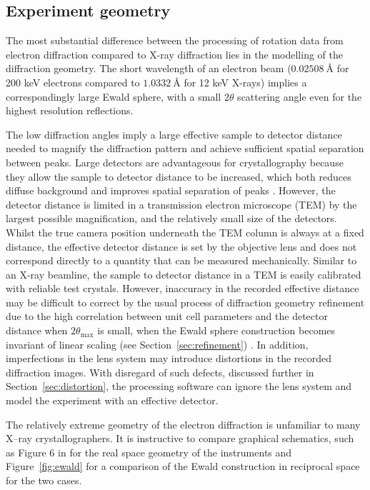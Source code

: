 \documentclass[preprint]{iucr}
\begin{document}
\subsection{Experiment geometry}

The most substantial difference between the processing of rotation data from
electron diffraction compared to X-ray diffraction lies in the modelling of the
diffraction geometry. The short wavelength of an electron beam
($\SI{0.02508}{\angstrom}$ for 200 keV electrons compared to
$\SI{1.0332}{\angstrom}$ for 12 keV X-rays) implies a correspondingly large
Ewald sphere, with a small
$2\theta$ scattering angle even for the highest resolution reflections.

The low
diffraction angles imply a large effective sample to detector distance needed to magnify
the diffraction pattern and achieve sufficient spatial
separation between peaks. Large detectors are advantageous
for crystallography because they allow the sample to detector distance to
be increased, which both reduces diffuse background and improves spatial
separation of peaks \cite{Stanton1993}. However,
the detector distance is limited in a transmission electron microscope (TEM)
by the largest possible magnification,
and the relatively small size of the detectors. Whilst the true camera position underneath the
TEM column is always at a fixed distance, the effective detector distance
is set by the objective lens and does not correspond directly to a quantity that
can be measured mechanically. Similar to an X-ray beamline, the sample to detector distance in
a TEM is easily calibrated with reliable test crystals. However,
inaccuracy in the recorded effective distance may be difficult to correct by the
usual process of diffraction geometry refinement due to the high correlation
between unit cell parameters and the detector distance when
$2\theta_{\text{max}}$ is small, when the Ewald sphere construction becomes
invariant of linear scaling (see Section~\ref{sec:refinement}) \cite{VanGenderen2016}.
In addition,
imperfections in the lens system may introduce distortions in the recorded
diffraction images.
With disregard of such defects, discussed further in Section~\ref{sec:distortion},
the processing software can ignore the lens system and model the experiment
with an effective detector.

The relatively
extreme geometry of the electron diffraction is unfamiliar to many X--ray
crystallographers. It is instructive to compare graphical schematics, such as
Figure 6 in \cite{Clabbers2018} for the real space geometry of the instruments
and Figure~\ref{fig:ewald} for a comparison of the Ewald construction in
reciprocal space for the two cases.
\end{document}
